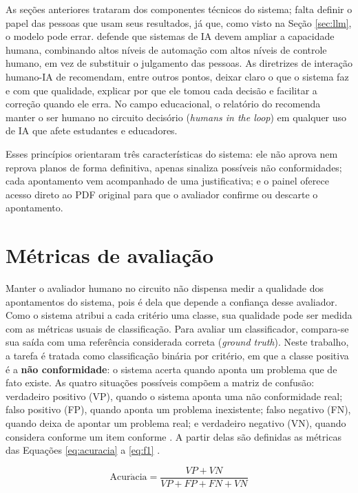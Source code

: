 As seções anteriores trataram dos componentes técnicos do sistema; falta definir o papel das pessoas que usam seus resultados, já que, como visto na Seção \ref{sec:llm}, o modelo pode errar.  defende que sistemas de IA devem ampliar a capacidade humana, combinando altos níveis de automação com altos níveis de controle humano, em vez de substituir o julgamento das pessoas. As diretrizes de interação humano-IA de  recomendam, entre outros pontos, deixar claro o que o sistema faz e com que qualidade, explicar por que ele tomou cada decisão e facilitar a correção quando ele erra. No campo educacional, o relatório do  recomenda manter o ser humano no circuito decisório (\textit{humans in the loop}) em qualquer uso de IA que afete estudantes e educadores.

Esses princípios orientaram três características do sistema: ele não aprova nem reprova planos de forma definitiva, apenas sinaliza possíveis não conformidades; cada apontamento vem acompanhado de uma justificativa; e o painel oferece acesso direto ao PDF original para que o avaliador confirme ou descarte o apontamento.

\section{Métricas de avaliação}
\label{sec:metricas}

Manter o avaliador humano no circuito não dispensa medir a qualidade dos apontamentos do sistema, pois é dela que depende a confiança desse avaliador. Como o sistema atribui a cada critério uma classe, sua qualidade pode ser medida com as métricas usuais de classificação. Para avaliar um classificador, compara-se sua saída com uma referência considerada correta (\textit{ground truth}). Neste trabalho, a tarefa é tratada como classificação binária por critério, em que a classe positiva é a \textbf{não conformidade}: o sistema acerta quando aponta um problema que de fato existe. As quatro situações possíveis compõem a matriz de confusão: verdadeiro positivo (VP), quando o sistema aponta uma não conformidade real; falso positivo (FP), quando aponta um problema inexistente; falso negativo (FN), quando deixa de apontar um problema real; e verdadeiro negativo (VN), quando considera conforme um item conforme \cite{Sokolova2009}. A partir delas são definidas as métricas das Equações \ref{eq:acuracia} a \ref{eq:f1} \cite{Sokolova2009}.

\begin{equation}
\label{eq:acuracia}
\mathrm{Acur\acute{a}cia} = \frac{VP + VN}{VP + FP + FN + VN}
\end{equation}

